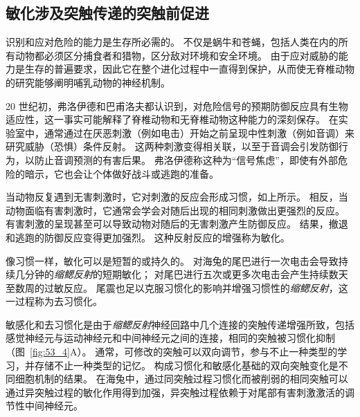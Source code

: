 \subsection{敏化涉及突触传递的突触前促进}

识别和应对危险的能力是生存所必需的。
不仅是蜗牛和苍蝇，包括人类在内的所有动物都必须区分捕食者和猎物，区分敌对环境和安全环境。
由于应对威胁的能力是生存的普遍要求，因此它在整个进化过程中一直得到保护，从而使无脊椎动物的研究能够阐明哺乳动物的神经机制。


20 世纪初，弗洛伊德和巴甫洛夫都认识到，对危险信号的预期防御反应具有生物适应性，这一事实可能解释了脊椎动物和无脊椎动物这种能力的深刻保存。
在实验室中，通常通过在厌恶刺激（例如电击）开始之前呈现中性刺激（例如音调）来研究威胁（恐惧）条件反射。
这两种刺激变得相关联，以至于音调会引发防御行为，以防止音调预测的有害后果。
弗洛伊德称这种为“信号焦虑”，即使有外部危险的暗示，它也会让个体做好战斗或逃跑的准备。


当动物反复遇到无害刺激时，它对刺激的反应会形成习惯，如上所示。
相反，当动物面临有害刺激时，它通常会学会对随后出现的相同刺激做出更强烈的反应。
有害刺激的呈现甚至可以导致动物对随后的无害刺激产生防御反应。
结果，撤退和逃跑的防御反应变得更加强烈。
这种反射反应的增强称为敏化。


像习惯一样，敏化可以是短暂的或持久的。
对海兔的尾巴进行一次电击会导致持续几分钟的\textit{缩鳃反射}的短期敏化；
对尾巴进行五次或更多次电击会产生持续数天至数周的过敏反应。
尾震也足以克服习惯化的影响并增强习惯性的\textit{缩鳃反射}，这一过程称为去习惯化。


敏感化和去习惯化是由于\textit{缩鳃反射}神经回路中几个连接的突触传递增强所致，包括感觉神经元与运动神经元和中间神经元之间的连接，相同的突触被习惯化抑制（图~\ref{fig:53_4}A）。
通常，可修改的突触可以双向调节，参与不止一种类型的学习，并存储不止一种类型的记忆。
构成习惯化和敏感化基础的双向突触变化是不同细胞机制的结果。
在海兔中，通过同突触过程习惯化而被削弱的相同突触可以通过异突触过程的敏化作用得到加强，异突触过程依赖于对尾部有害刺激激活的调节性中间神经元。


